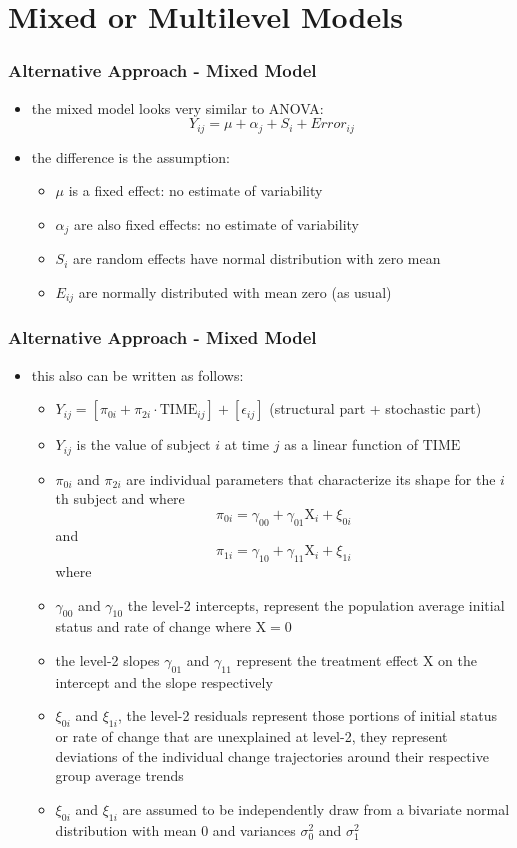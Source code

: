 \section{Mixed or Multilevel Models}
\begin{frame}\frametitle{Alternative Approach - Mixed Model}
  \begin{itemize}
  \item the mixed model looks very similar to ANOVA: $$Y_{ij} = \mu + \alpha_j + S_i + Error_{ij}$$
  \item the difference is the assumption:
    \begin{itemize}
    \item $\mu$ is a fixed effect: no estimate of variability
    \item $\alpha_j$ are also fixed effects: no estimate of variability
    \item $S_i$ are random effects have normal distribution with zero mean
    \item $E_{ij}$ are normally distributed with mean zero (as usual)
    \end{itemize}
  \end{itemize}
\end{frame}

\begin{frame}\frametitle{Alternative Approach - Mixed Model}
  \begin{itemize}
  \item this also can be written as follows:
    \begin{itemize}
    \item $Y_{ij} = [\pi_{0i} + \pi_{2i} \cdot \mathrm{TIME}_{ij}] + [\epsilon_{ij}]$ (structural part + stochastic part)
    \item $Y_{ij}$ is the value of subject $i$ at time $j$ as a linear function of $\mathrm{TIME}$
    \item $\pi_{0i}$ and $\pi_{2i}$ are individual parameters that characterize its shape for the $i$th subject and where 
      $$\pi_{0i} = \gamma_{00} + \gamma_{01}\mathrm{X}_i + \xi_{0i}$$ and
      $$\pi_{1i} = \gamma_{10} + \gamma_{11}\mathrm{X}_i + \xi_{1i}$$ where
    \item $\gamma_{00}$ and $\gamma_{10}$ the level-2 intercepts, represent the population average initial status and rate of change where $\mathrm{X}=0$ 
    \item the level-2 slopes $\gamma_{01}$ and $\gamma_{11}$ represent the treatment effect $\mathrm{X}$ on the intercept and the slope respectively
    \item $\xi_{0i}$ and $\xi_{1i}$, the level-2 residuals represent those portions of initial status or rate of change that are unexplained at level-2, they represent deviations of the individual change trajectories around their respective group average trends
    \item $\xi_{0i}$ and $\xi_{1i}$ are assumed to be independently draw from a bivariate normal distribution with mean 0 and variances $\sigma_0^2$ and $\sigma_1^2$
    \end{itemize}
  \end{itemize}
\end{frame}

